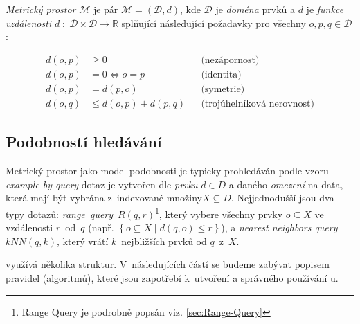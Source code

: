\emph{Metrický prostor }$\mathcal{M}$ je pár $\mathcal{M}=(\mathcal{D},d)$,
kde $\mathcal{D}$ je \emph{doména} prvků a $d$ je \emph{funkce vzdálenosti}
$d\;:\;\mathcal{D}\times\mathcal{D}\rightarrow\mathbb{R}$ splňující
následující požadavky pro všechny $o,p,q\in\mathcal{D}$:

\begin{align*}
d(o,p) & \geq0 &  & \textrm{(nezápornost)}\\
d(o,p) & =0\Longleftrightarrow o=p &  & \textrm{(identita)}\\
d(o,p) & =d(p,o) &  & \textrm{(symetrie)}\\
d(o,q) & \leq d(o,p)+d(p,q) &  & \textrm{(trojúhelníková nerovnost)}
\end{align*}



\subsection{Podobností hledávání}

Metrický prostor jako model podobnosti je typicky prohledáván podle
vzoru \emph{example-by-query} \textendash{} dotaz je vytvořen dle
\emph{prvku} $d\in D$ a daného \emph{omezení} na data, která mají
být vybrána z~indexované množiny$X\subseteq D$\@. Nejjednodušší
jsou dva typy dotazů: \emph{range~query}~$R(q,r)$\footnote{Range Query je podrobně popsán viz. \vref{sec:Range-Query}
}, který vybere všechny prvky $o\subseteq X$ ve vzdálenosti $r$~od~$q$
(např. $\left\{ o\subseteq X\mid d(q,o)\leq r\right\} $), a \emph{nearest
neighbors query} $kNN(q,k)$, který vrátí $k$~nejbližších prvků
od $q$~z~$X$\@.

\MIndex využívá několika struktur\@. V~následujících částí se budeme
zabývat popisem pravidel (algoritmů), které jsou zapotřebí k~utvoření
a správného používání \MIndex u.